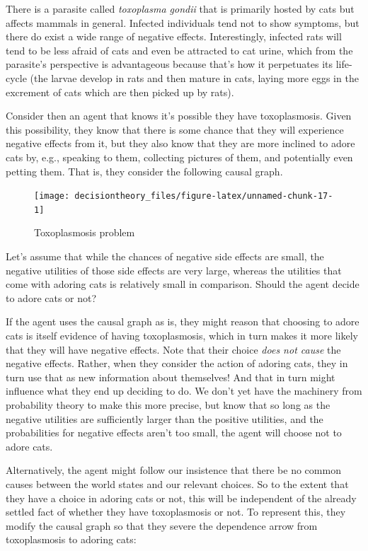\documentclass[]{tufte-book}
\begin{document}
There is a parasite called \emph{toxoplasma gondii} that is primarily hosted by cats but affects mammals in general. Infected individuals tend not to show symptoms, but there do exist a wide range of negative effects. Interestingly, infected rats will tend to be less afraid of cats and even be attracted to cat urine, which from the parasite's perspective is advantageous because that's how it perpetuates its life-cycle (the larvae develop in rats and then mature in cats, laying more eggs in the excrement of cats which are then picked up by rats).

Consider then an agent that knows it's possible they have toxoplasmosis. Given this possibility, they know that there is some chance that they will experience negative effects from it, but they also know that they are more inclined to adore cats by, e.g., speaking to them, collecting pictures of them, and potentially even petting them. That is, they consider the following causal graph.

\begin{figure}
\texttt{[image: decisiontheory\_files/figure-latex/unnamed-chunk-17-1]} \caption[Toxoplasmosis problem]{Toxoplasmosis problem}\label{fig:unnamed-chunk-17}
\end{figure}

Let's assume that while the chances of negative side effects are small, the negative utilities of those side effects are very large, whereas the utilities that come with adoring cats is relatively small in comparison. Should the agent decide to adore cats or not?

If the agent uses the causal graph as is, they might reason that choosing to adore cats is itself evidence of having toxoplasmosis, which in turn makes it more likely that they will have negative effects. Note that their choice \emph{does not cause} the negative effects. Rather, when they consider the action of adoring cats, they in turn use that as new information about themselves! And that in turn might influence what they end up deciding to do. We don't yet have the machinery from probability theory to make this more precise, but know that so long as the negative utilities are sufficiently larger than the positive utilities, and the probabilities for negative effects aren't too small, the agent will choose not to adore cats.

Alternatively, the agent might follow our insistence that there be no common causes between the world states and our relevant choices. So to the extent that they have a choice in adoring cats or not, this will be independent of the already settled fact of whether they have toxoplasmosis or not. To represent this, they modify the causal graph so that they severe the dependence arrow from toxoplasmosis to adoring cats:
\end{document}
